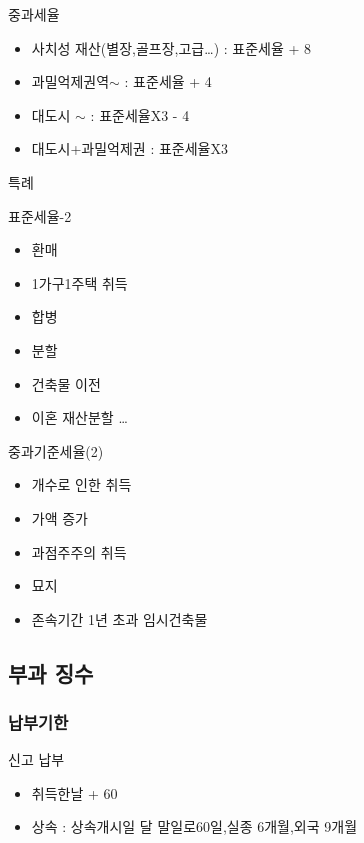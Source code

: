 \documentclass{oblivoir}
\begin{document}
\begin{multicols}{2}
중과세율

\begin{itemize}
\itemsep1pt\parskip0pt
\item
  사치성 재산(별장,골프장,고급\ldots{}) : 표준세율 + 8
\item
  과밀억제권역$\sim$ : 표준세율 + 4
\item
  대도시 $\sim$ : 표준세율X3 - 4
\item
  대도시+과밀억제권 : 표준세율X3
\end{itemize}

특례

표준세율-2

\begin{itemize}
\itemsep1pt\parskip0pt
\item
  환매
\item
  1가구1주택 취득
\item
  합병
\item
  분할
\item
  건축물 이전
\item
  이혼 재산분할 \ldots{}
\end{itemize}

중과기준세율(2)

\begin{itemize}
\itemsep1pt\parskip0pt
\item
  개수로 인한 취득
\item
  가액 증가
\item
  과점주주의 취득
\item
  묘지
\item
  존속기간 1년 초과 임시건축물
\end{itemize}

\subsection{부과 징수}\label{uxbd80uxacfc-uxc9d5uxc218}

\subsubsection{납부기한}\label{uxb0a9uxbd80uxae30uxd55c}

신고 납부

\begin{itemize}
\itemsep1pt\parskip0pt
\item
  취득한날 + 60
\item
  상속 : 상속개시일 달 말일로60일,실종 6개월,외국 9개월
\end{itemize}


\end{multicols}
\end{document}
